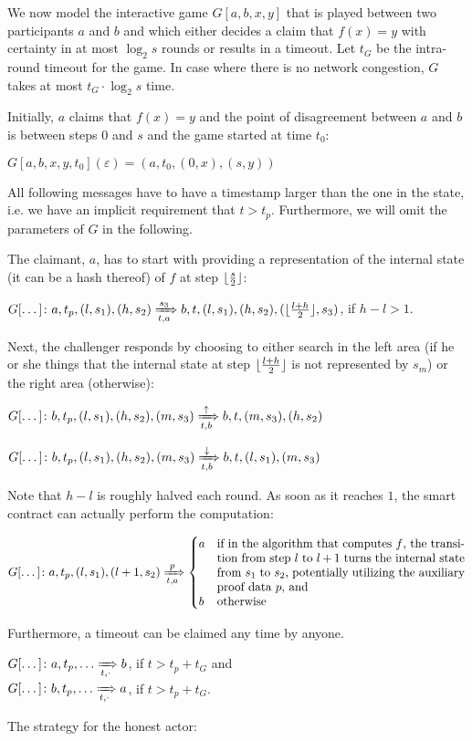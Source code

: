 \documentclass[11pt,letterpaper]{article}
\DeclarePairedDelimiter\floor{\lfloor}{\rfloor}
\begin{document}
We now model the interactive game $G[a,b,x,y]$ that is played between two participants $a$ and $b$ and which either decides a
claim that $f(x) = y$ with
certainty in at most $\log_2 s$ rounds or results in a timeout. Let $t_G$ be the intra-round timeout for the game.
In case where there is no network congestion, $G$ takes at most $t_G \cdot \log_2 s$ time.

Initially, $a$ claims that $f(x) = y$ and the point of disagreement between $a$ and $b$ is between steps $0$ and $s$
and the game started at time $t_0$:

$G[a,b,x,y,t_0](\varepsilon) = (a, t_0, (0, x), (s, y))$

All following messages have to have a timestamp larger than the one in the state, i.e. we have an implicit requirement that $t > t_p$.
Furthermore, we will omit the parameters of $G$ in the following.

The claimant, $a$, has to start with providing a representation of the internal state (it can be a hash thereof)
of $f$ at step $\floor{\frac{s}{2}}$:

$G[\dots]\colon a, t_p, (l, s_1), (h, s_2) \xRightarrow[t, a]{s_3} b, t, (l, s_1), (h, s_2), (\floor{\frac{l+h}{2}}, s_3)$, \quad if $h - l > 1$.

Next, the challenger responds by choosing to either search in the left area (if he or she things that the internal state
at step $\floor{\frac{l+h}{2}}$ is not represented by $s_m$) or the right area (otherwise):

$G[\dots]\colon b, t_p, (l, s_1), (h, s_2), (m, s_3) \xRightarrow[t, b]{\uparrow} b, t, (m, s_3), (h, s_2)$

$G[\dots]\colon b, t_p, (l, s_1), (h, s_2), (m, s_3) \xRightarrow[t, b]{\downarrow} b, t, (l, s_1), (m, s_3)$

Note that $h-l$ is roughly halved each round. As soon as it reaches $1$, the smart contract can actually perform the computation:

\[
G[\dots]\colon a, t_p, (l, s_1), (l+1, s_2) \xRightarrow[t, a]{p}
\begin{cases} a &\parbox[t]{.6\textwidth}{if in the algorithm that computes $f$, the transition from step $l$ to $l+1$ turns
    the internal state from $s_1$ to $s_2$, potentially utilizing the auxiliary proof data $p$, and}\\
b &\text{otherwise}
\end{cases}
\]

Furthermore, a timeout can be claimed any time by anyone.

$G[\dots]\colon a, t_p, \dots \xRightarrow[t, \cdot]{} b$, \quad if $t > t_p + t_G$ and \\
$G[\dots]\colon b, t_p, \dots \xRightarrow[t, \cdot]{} a$, \quad if $t > t_p + t_G$.


The strategy for the honest actor:
\end{document}
